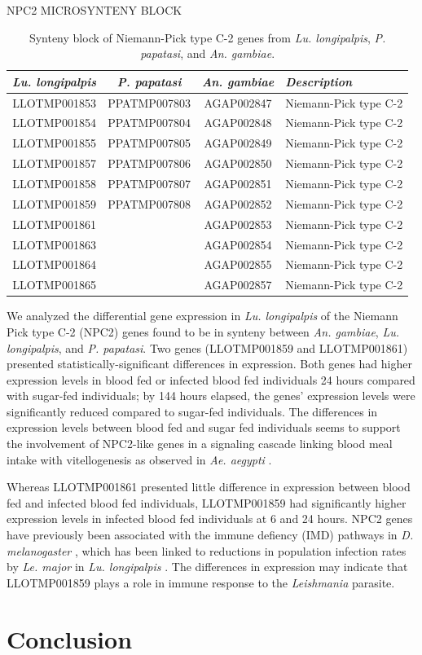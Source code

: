 \begin{table}[H]
  \centering
  \caption{NPC2 MICROSYNTENY BLOCK}
  \begin{tabular}{c c c l} \hline
    \emph{Lu. longipalpis} & \emph{P. papatasi} & \emph{An. gambiae} & \emph{Description} \\ \hline
    LLOTMP001853 & PPATMP007803 & AGAP002847 & Niemann-Pick type C-2 \\
    LLOTMP001854 & PPATMP007804 & AGAP002848 & Niemann-Pick type C-2 \\
    LLOTMP001855 & PPATMP007805 & AGAP002849 & Niemann-Pick type C-2 \\
    LLOTMP001857 & PPATMP007806 & AGAP002850 & Niemann-Pick type C-2 \\
    LLOTMP001858 & PPATMP007807 & AGAP002851 & Niemann-Pick type C-2 \\
    LLOTMP001859 & PPATMP007808 & AGAP002852 & Niemann-Pick type C-2 \\
    LLOTMP001861 & & AGAP002853 & Niemann-Pick type C-2 \\
    LLOTMP001863 & & AGAP002854 & Niemann-Pick type C-2 \\
    LLOTMP001864 & & AGAP002855 & Niemann-Pick type C-2 \\
    LLOTMP001865 & & AGAP002857 & Niemann-Pick type C-2
    \end{tabular}
    \caption*{Synteny block of Niemann-Pick type C-2 genes from \emph{Lu. longipalpis}, \emph{P. papatasi}, and \emph{An. gambiae}.}
  \label{tab:synteny-three-way-npc2}
\end{table}

We analyzed the differential gene expression in \emph{Lu. longipalpis} of the Niemann Pick type C-2 (NPC2) genes found to be in synteny between \emph{An. gambiae}, \emph{Lu. longipalpis}, and \emph{P. papatasi}.  Two genes (LLOTMP001859 and LLOTMP001861) presented statistically-significant differences in expression. Both genes had higher expression levels in blood fed or infected blood fed individuals 24 hours compared with sugar-fed individuals; by 144 hours elapsed, the genes' expression levels were significantly reduced compared to sugar-fed individuals.  The differences in expression levels between blood fed and sugar fed individuals seems to support the involvement of NPC2-like genes in a signaling cascade linking blood meal intake with vitellogenesis as observed in \emph{Ae. aegypti} \cite{Sirot2011}.

Whereas LLOTMP001861 presented little difference in expression between blood fed and infected blood fed individuals, LLOTMP001859 had significantly higher expression levels in infected blood fed individuals at 6 and 24 hours. NPC2 genes have previously been associated with the immune defiency (IMD) pathways in \emph{D. melanogaster} \cite{Shi2012}, which has been linked to reductions in population infection rates by \emph{Le. major} in \emph{Lu. longipalpis} \cite{Telleria2012}. The differences in expression may indicate that LLOTMP001859 plays a role in immune response to the \emph{Leishmania} parasite.


\section{Conclusion}





